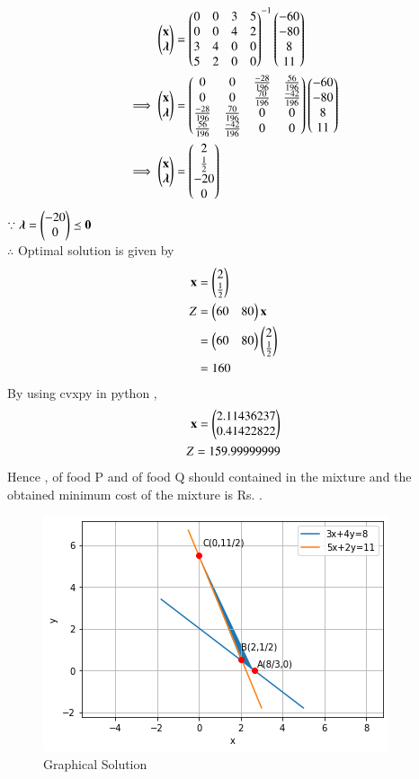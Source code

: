 \documentclass[journal,12pt,twocolumn]{IEEEtran}
\begin{document}
\begin{align}
    \begin{pmatrix}\mathbf{x} \\ \boldsymbol{\lambda}\end{pmatrix} &= \begin{pmatrix}0 & 0 & 3 & 5 \\ 0 & 0 & 4 & 2 \\ 3 & 4 & 0 & 0 \\ 5 & 2 & 0 & 0\end{pmatrix}^{-1}\begin{pmatrix}-60 \\-80 \\ 8 \\ 11\end{pmatrix}
    \\
    \implies   \begin{pmatrix}\mathbf{x} \\ \boldsymbol{\lambda}\end{pmatrix} &= \begin{pmatrix}0 & 0 & \frac{-28}{196} & \frac{56}{196} \\ 0 & 0 & \frac{70}{196} & \frac{-42}{196} \\ \frac{-28}{196} & \frac{70}{196} & 0 & 0 \\ \frac{56}{196} & \frac{-42}{196} & 0 & 0\end{pmatrix}\begin{pmatrix}-60 \\-80 \\ 8 \\ 11\end{pmatrix}
    \\
    \implies \begin{pmatrix}\mathbf{x} \\ \boldsymbol{\lambda}\end{pmatrix} &= \begin{pmatrix}2 \\ \frac{1}{2} \\ -20 \\ 0 \end{pmatrix}
\end{align}
$\because \boldsymbol{\lambda}=\begin{pmatrix}-20 \\ 0\end{pmatrix} \preceq \mathbf{0} $
\\
$\therefore$ Optimal solution is given by
\begin{align}
    \mathbf{x} &= \begin{pmatrix}2\\ \frac{1}{2}\end{pmatrix} \\
    Z &= \begin{pmatrix}60 & 80\end{pmatrix}\mathbf{x} \\
    &= \begin{pmatrix}60 & 80\end{pmatrix}\begin{pmatrix}2 \\ \frac{1}{2}\end{pmatrix} \\
    &= 160
\end{align}
By using cvxpy in python ,
\begin{align}
    \mathbf{x}=\begin{pmatrix}2.11436237\\0.41422822\end{pmatrix}\\
    Z = 159.99999999
\end{align}
Hence , of food P and  of food Q should contained in the mixture and the obtained minimum cost of the mixture is Rs. .
\begin{figure}[!ht]
\centering
\includegraphics[width=\columnwidth]{Graphical Solution_10.png}
\caption{Graphical Solution}
\label{fig:Graphical Solution}	
\end{figure}
\end{document}
